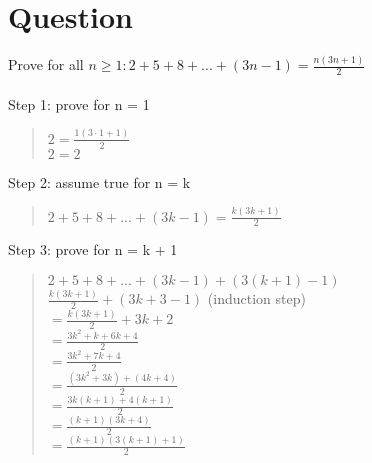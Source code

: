 \documentclass{article}
\begin{document}
\section{Question}
Prove for all \({n ≥ 1: 2 + 5 + 8 + ... + (3n - 1) = \frac{n(3n + 1)}{2}}\) \\ \\
Step 1: prove for n = 1 \\
\begin{quote}
\(2 = \frac{1(3 \cdot 1 + 1)}{2}\) \\
\(2 = 2\)
\end{quote}

Step 2: assume true for n = k \\
\begin{quote}
\(2 + 5 + 8 + ... + (3k - 1) = \frac{k(3k + 1)}{2}\)
\end{quote}

Step 3: prove for n = k + 1 \\
\begin{quote}
\(2 + 5 + 8 + ... + (3k - 1) + (3(k + 1) - 1)\) \\
\(\frac{k(3k + 1)}{2} + (3k + 3 - 1)\) (induction step) \\
\(= \frac{k(3k + 1)}{2} + 3k + 2\) \\
\(= \frac{3k^2 + k + 6k + 4}{2}\) \\
\(= \frac{3k^2 + 7k + 4}{2}\) \\
\(= \frac{(3k^2 + 3k) + (4k + 4)}{2}\) \\
\(= \frac{3k(k + 1) + 4(k + 1)}{2}\) \\
\(= \frac{(k + 1)(3k + 4)}{2}\) \\
\(= \frac{(k + 1)(3(k + 1) + 1)}{2}\)
\end{quote}
\end{document}
